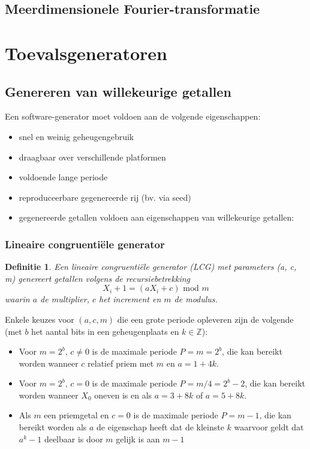 \documentclass{article}
\newtheorem{mydef}{Definitie}
\begin{document}
	\subsection{Meerdimensionele Fourier-transformatie}
	
	\section{Toevalsgeneratoren}

	
	\subsection{Genereren van willekeurige getallen}
	
	Een software-generator moet voldoen aan de volgende eigenschappen:
	
	\begin{itemize}
		\item snel en weinig geheugengebruik
		\item draagbaar over verschillende platformen
		\item voldoende lange periode
		\item reproduceerbare gegenereerde rij (bv. via seed)
		\item gegenereerde getallen voldoen aan eigenschappen van willekeurige getallen:
	\end{itemize}

	\subsubsection{Lineaire congruentiële generator}

	\begin{mydef}
		Een lineaire congruentiële generator (LCG) met parameters (a, c, m) genereert getallen volgens de recursiebetrekking
		$$
			X_i+1 = (aX_i + c)\text{ mod }m
		$$
		waarin $a$ de \textit{multiplier}, $c$ het \textit{increment} en $m$ de \textit{modulus}.
	\end{mydef}

	Enkele keuzes voor $(a,c,m)$ die een grote periode opleveren zijn de volgende (met $b$ het aantal bits in een geheugenplaats en $k \in \mathbb{Z}$):
	\begin{itemize}
		\item Voor $m=2^b$, $c \neq 0$ is de maximale periode $P=m=2^b$, die kan bereikt worden wanneer $c$ relatief priem met $m$ en $a=1+4k$.
		\item Voor $m=2^b$, $c=0$ is de maximale periode $P=m/4=2^b-2$, die kan bereikt worden wanneer $X_0$ oneven is en als $a=3+8k$ of $a=5+8k$.
		\item Als $m$ een priemgetal en $c=0$ is de maximale periode $P=m-1$, die kan bereikt worden als $a$ de eigenschap heeft dat de kleinste $k$ waarvoor geldt dat $a^k-1$ deelbaar is door $m$ gelijk is aan $m-1$
	\end{itemize}
	
\end{document}
